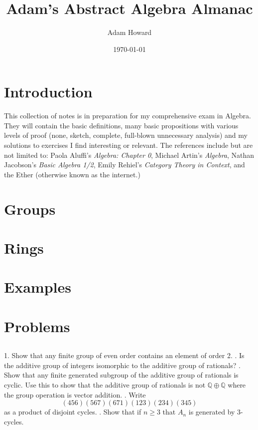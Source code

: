 \documentclass[11pt, oneside]{article}   	%
\title{Adam's Abstract Algebra Almanac}
\author{Adam Howard}
\date{\today}							%
\begin{document}
\maketitle
\section*{Introduction}
This collection of notes is in preparation for my comprehensive exam in Algebra. They will contain the basic definitions, many basic propositions with various levels of proof (none, sketch, complete, full-blown unnecessary analysis) and my solutions to exercises I find interesting or relevant. The references include but are not limited to: Paola Aluffi's \textit{Algebra: Chapter 0}, Michael Artin's \textit{Algebra}, Nathan Jacobson's \textit{Basic Algebra 1/2}, Emily Rehiel's \textit{Category Theory in Context}, and the Ether (otherwise known as the internet.)
\section*{Groups}
\section*{Rings}
\text


\section*{Examples}

\section*{Problems}
\subsection{}
1. Show that any finite group of even order contains an element of order 2. . Is the additive group of integers isomorphic to the additive group of rationals? . Show that any finite generated subgroup of the additive group of rationals is cyclic. Use this to show that the additive group of rationals is not $\mathbb{Q} \oplus \mathbb{Q}$ where the group operation is vector addition.  . Write $$(456)(567)(671)(123)(234)(345)$$ as a product of disjoint cycles. . Show that if $n \geq 3$ that $A_{n}$ is generated by 3-cycles.
\end{document}
